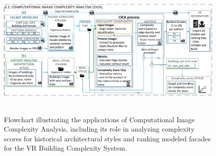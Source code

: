 \documentclass[final,5p,times]{elsarticle}
\begin{document}
            \begin{figure}[!htb]
                \centering
                \includegraphics[width= \linewidth]{Images/CICAFlowchart}~\caption{Flowchart illustrating the applications of Computational Image Complexity Analysis, including its role in analyzing complexity scores for historical architectural styles and ranking modeled facades for the VR Building Complexity System.}
                  \label{fig:ImageComplexityAnalysisFlowchart}
            \end{figure}
\end{document}
